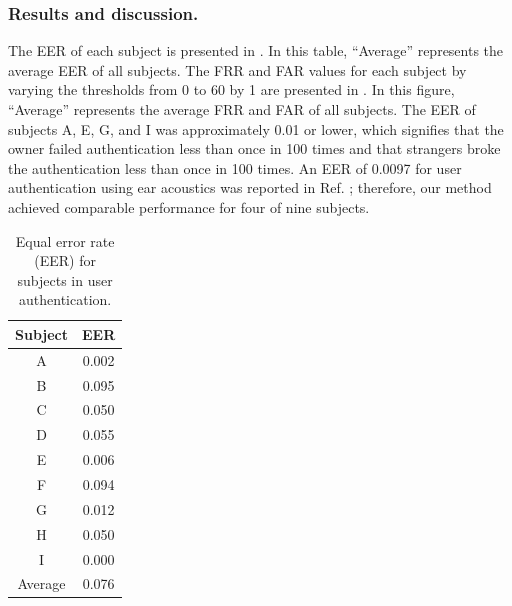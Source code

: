 \documentclass[english,preprint,JIP]{ipsj}
\begin{document}
\subsubsection{Results and discussion.}
The EER of each subject is presented in . In this table, ``Average'' represents the average EER of all subjects. The FRR and FAR values for each subject by varying the thresholds from 0 to 60 by 1 are presented in . In this figure, ``Average'' represents the average FRR and FAR of all subjects. The EER of subjects A, E, G, and I was approximately 0.01 or lower, which signifies that the owner failed authentication less than once in 100 times and that strangers broke the authentication less than once in 100 times. An EER of 0.0097 for user authentication using ear acoustics was reported in Ref. \cite{ear_auth}; therefore, our method achieved comparable performance for four of nine subjects.\par

\begin{table}[!t]
  \centering
  \caption{Equal error rate (EER) for subjects in user authentication.}
  \begin{tabular}{c|c} \hline\hline
    Subject & EER \\ \hline
    A & 0.002 \\
    B & 0.095 \\
    C & 0.050 \\
    D & 0.055 \\
    E & 0.006 \\
    F & 0.094 \\
    G & 0.012 \\
    H & 0.050 \\
    I & 0.000 \\ \hline
    Average & 0.076 \\ \hline
  \end{tabular}
  \label{tab:EER_num}
\end{table}
\end{document}
